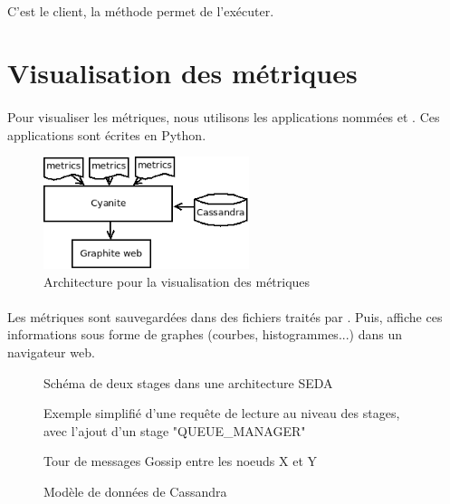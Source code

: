 \documentclass[12pt]{article}
\begin{document}
\paragraph{} C'est le client, la méthode  permet de l'exécuter.



\newpage


\section{Visualisation des métriques}

\paragraph{} Pour visualiser les métriques, nous utilisons les applications nommées  et . Ces applications sont écrites en Python.

\begin{figure}[H]
	\centering
		\includegraphics[width=6cm]{schemas/cyanite.png}
	\caption{Architecture pour la visualisation des métriques}
\end{figure}

\paragraph{} Les métriques sont sauvegardées dans des fichiers traités par . 
Puis,  affiche ces informations sous forme de graphes (courbes, histogrammes...) dans un navigateur web.

\newpage



\begin{figure}[p]
	\centering
		
	\caption{Schéma de deux stages dans une architecture SEDA \label{fig:stages}}
\end{figure}

\begin{figure}[p]
	\centering
		
	\caption{Exemple simplifié d'une requête de lecture au niveau des stages, avec l'ajout d'un stage "QUEUE\_MANAGER" \label{fig:read_request}}
\end{figure}

\begin{figure}[p]
	\centering
		
	\caption{Tour de messages Gossip entre les noeuds X et Y \label{fig:round_gossip}}
\end{figure}

\begin{figure}[p]
	\centering
		
	\caption{Modèle de données de Cassandra \label{fig:keyspace}}
\end{figure}
\end{document}
